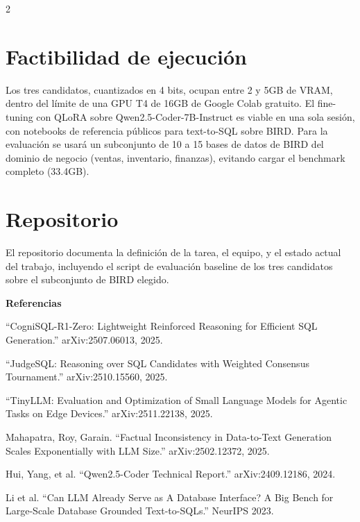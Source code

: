 \documentclass[10pt]{article}
\begin{document}
\begin{multicols}{2}
\section{Factibilidad de ejecuci\'on}
Los tres candidatos, cuantizados en 4 bits, ocupan entre 2 y 5GB de VRAM, dentro del l\'imite de una GPU T4 de 16GB de Google Colab gratuito. El fine-tuning con QLoRA sobre Qwen2.5-Coder-7B-Instruct es viable en una sola sesi\'on, con notebooks de referencia p\'ublicos para text-to-SQL sobre BIRD. Para la evaluaci\'on se usar\'a un subconjunto de 10 a 15 bases de datos de BIRD del dominio de negocio (ventas, inventario, finanzas), evitando cargar el benchmark completo (33.4GB).

\section{Repositorio}
El repositorio documenta la definici\'on de la tarea, el equipo, y el estado actual del trabajo, incluyendo el script de evaluaci\'on baseline de los tres candidatos sobre el subconjunto de BIRD elegido.

\vfill
\begin{footnotesize}
\textbf{Referencias}
\begin{enumerate}[leftmargin=1.1em, label={[\arabic*]}, itemsep=0pt, topsep=1pt, parsep=0pt]
\item ``CogniSQL-R1-Zero: Lightweight Reinforced Reasoning for Efficient SQL Generation.'' arXiv:2507.06013, 2025.
\item ``JudgeSQL: Reasoning over SQL Candidates with Weighted Consensus Tournament.'' arXiv:2510.15560, 2025.
\item ``TinyLLM: Evaluation and Optimization of Small Language Models for Agentic Tasks on Edge Devices.'' arXiv:2511.22138, 2025.
\item Mahapatra, Roy, Garain. ``Factual Inconsistency in Data-to-Text Generation Scales Exponentially with LLM Size.'' arXiv:2502.12372, 2025.
\item Hui, Yang, et al. ``Qwen2.5-Coder Technical Report.'' arXiv:2409.12186, 2024.
\item Li et al. ``Can LLM Already Serve as A Database Interface? A Big Bench for Large-Scale Database Grounded Text-to-SQLs.'' NeurIPS 2023.
\end{enumerate}
\end{footnotesize}

\end{multicols}
\end{document}
